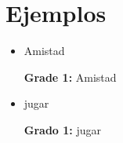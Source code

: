 \documentclass[draft]{article}
\begin{document}
\section{Ejemplos}

\sloppy
\begin{itemize}
	\item Amistad 
	
	{\bf Grade 1:} Amistad \\
	

	
\end{itemize}

\begin{itemize}
	\item jugar
	
	{\bf Grado 1:} jugar \\
	
	
	
\end{itemize}
\end{document}
